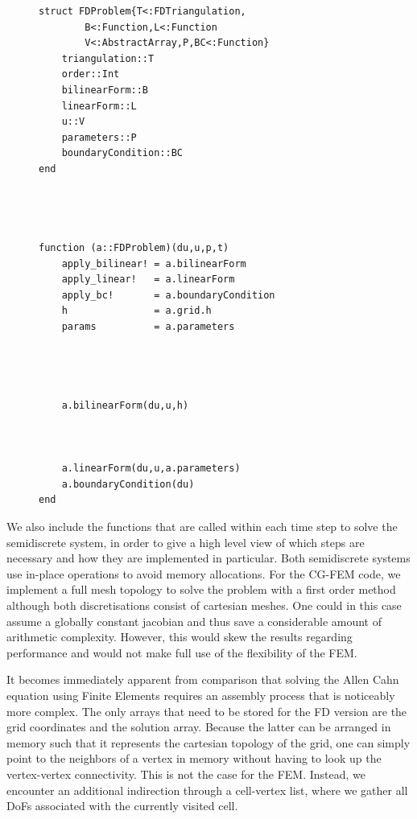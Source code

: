 \documentclass[sn-mathphys,Numbered]{sn-jnl}%
\theoremstyle{thmstyleone}%
\theoremstyle{thmstyletwo}%
\theoremstyle{thmstylethree}%
\begin{document}
\begin{figure}[!htbp]
\begin{minipage}[t]{0.5\textwidth}
\begin{verbatim}
struct FDProblem{T<:FDTriangulation,
        B<:Function,L<:Function
        V<:AbstractArray,P,BC<:Function}
    triangulation::T
    order::Int
    bilinearForm::B
    linearForm::L
    u::V
    parameters::P
    boundaryCondition::BC
end




function (a::FDProblem)(du,u,p,t)
    apply_bilinear! = a.bilinearForm
    apply_linear!   = a.linearForm
    apply_bc!       = a.boundaryCondition
    h               = a.grid.h
    params          = a.parameters




    a.bilinearForm(du,u,h)



    a.linearForm(du,u,a.parameters)
    a.boundaryCondition(du)
end
\end{verbatim}
\end{minipage}

\vspace{0.2cm}
\label{lst:ac-code}
\end{figure}

We also include the functions that are called within each time step to solve the semidiscrete system, in order to give a high level view of which steps are necessary and how they are implemented in particular. 
Both semidiscrete systems use in-place operations to avoid memory allocations.
For the CG-FEM code, we implement a full mesh topology to solve the problem with a first order method although both discretisations consist of cartesian meshes.
One could in this case assume a globally constant jacobian and thus save a considerable amount of arithmetic complexity.
However, this would skew the results regarding performance and would not make full use of the flexibility of the FEM.

It becomes immediately apparent from comparison that solving the Allen Cahn equation using Finite Elements requires an assembly process that is noticeably more complex.
The only arrays that need to be stored for the FD version are the grid coordinates and the solution array.
Because the latter can be arranged in memory such that it represents the cartesian topology of the grid, one can simply point to the neighbors of a vertex in memory without having to look up the vertex-vertex connectivity.
This is not the case for the FEM.
Instead, we encounter an additional indirection through a cell-vertex list, where we gather all DoFs associated with the currently visited cell.
\end{document}

